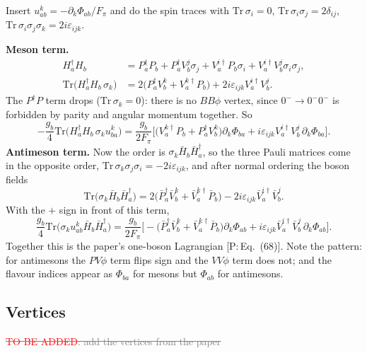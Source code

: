 \documentclass[11pt,a4paper]{article}
\newcommand{\tagP}[1]{\textcolor{blue!65!black}{\textsf{\small[P:\,#1]}}}
\newcommand{\todo}{\textcolor{red}{TO BE ADDED}}
\newcommand{\aifix}[2]{\textcolor{gray}{\sout{#1}} \textcolor{aicolor}{#2}}
\newcommand{\aifix}[2]{#2}
\newenvironment{aiadd}{\par}{\par}
\begin{document}
\begin{aiadd}
	Insert $u^k_{ab}=-\partial_k\Phi_{ab}/F_\pi$ and do the spin traces with
	$\mathrm{Tr}\,\sigma_i=0$, $\mathrm{Tr}\,\sigma_i\sigma_j=2\delta_{ij}$, $\mathrm{Tr}\,\sigma_i\sigma_j\sigma_k=2i\varepsilon_{ijk}$.

	\textbf{Meson term.}
	\begin{align*}
		H_a^\dagger H_b                                & =P_a^\dagger P_b+P_a^\dagger V_b^j\sigma_j+V_a^{i\dagger}P_b\sigma_i+V_a^{i\dagger}V_b^j\sigma_i\sigma_j, \\
		\mathrm{Tr}\big(H_a^\dagger H_b\,\sigma_k\big) & =2\big(P_a^\dagger V_b^k+V_a^{k\dagger}P_b\big)+2i\varepsilon_{ijk}V_a^{i\dagger}V_b^j .
	\end{align*}
	The $P^\dagger P$ term drops ($\mathrm{Tr}\,\sigma_k=0$): there is no $BB\phi$ vertex, since $0^-\to0^-0^-$ is forbidden by parity and angular momentum together. So
	\[
		-\frac{g_b}{4}\mathrm{Tr}\big(H_a^\dagger H_b\,\sigma_ku^k_{ba}\big)
		=\frac{g_b}{2F_\pi}\Big[\big(V_a^{k\dagger}P_b+P_a^\dagger V_b^k\big)\partial_k\Phi_{ba}+i\varepsilon_{ijk}V_a^{i\dagger}V_b^j\,\partial_k\Phi_{ba}\Big].
	\]
	\textbf{Antimeson term.} Now the order is $\sigma_k\bar H_b\bar H_a^\dagger$, so the three Pauli matrices come in the opposite order, $\mathrm{Tr}\,\sigma_k\sigma_j\sigma_i=-2i\varepsilon_{ijk}$, and after normal ordering the boson fields
	\[
		\mathrm{Tr}\big(\sigma_k\bar H_b\bar H_a^\dagger\big)=2\big(\bar P_a^\dagger\bar V_b^k+\bar V_a^{k\dagger}\bar P_b\big)-2i\varepsilon_{ijk}\bar V_a^{i\dagger}\bar V_b^j .
	\]
	With the $+$ sign in front of this term,
	\[
		\frac{g_b}{4}\mathrm{Tr}\big(\sigma_ku^k_{ab}\bar H_b\bar H_a^\dagger\big)
		=\frac{g_b}{2F_\pi}\Big[-\big(\bar P_a^\dagger\bar V_b^k+\bar V_a^{k\dagger}\bar P_b\big)\partial_k\Phi_{ab}+i\varepsilon_{ijk}\bar V_a^{i\dagger}\bar V_b^j\,\partial_k\Phi_{ab}\Big].
	\]
	Together this is the paper's one-boson Lagrangian \tagP{Eq.~(68)}. Note the pattern: for antimesons the $PV\phi$ term flips sign and the $VV\phi$ term does not; and the flavour indices appear as $\Phi_{ba}$ for mesons but $\Phi_{ab}$ for antimesons.
\end{aiadd}

\subsection{Vertices}

\aifix{\todo: add the vertices from the paper}{}
\end{document}
